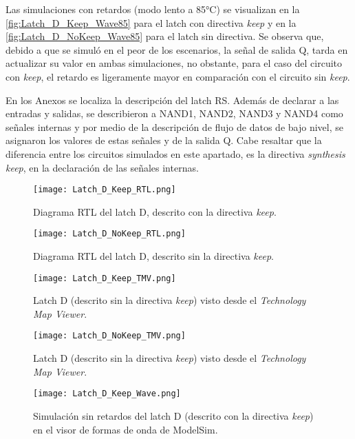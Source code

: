 Las simulaciones con retardos (modo lento a 85°C) se visualizan en la \autoref{fig:Latch_D_Keep_Wave85} para el latch con directiva \textit{keep} y en la \autoref{fig:Latch_D_NoKeep_Wave85} para el latch sin directiva. Se observa que, debido a que se simuló en el peor de los escenarios, la señal de salida Q, tarda en actualizar su valor en ambas simulaciones, no obstante, para el caso del circuito con \textit{keep}, el retardo es ligeramente mayor en comparación con el circuito sin \textit{keep}.

En los Anexos se localiza la descripción del latch RS. Además de declarar a las entradas y salidas, se describieron a NAND1, NAND2, NAND3 y NAND4 como señales internas y por medio de la descripción de flujo de datos de bajo nivel, se asignaron los valores de estas señales y de la salida Q. Cabe resaltar que la diferencia entre los circuitos simulados en este apartado, es la directiva \textit{synthesis keep}, en la declaración de las señales internas.

\begin{figure}[ht]
	\centering
	\texttt{[image: Latch\_D\_Keep\_RTL.png]}
	\caption{Diagrama RTL del latch D, descrito con la directiva \textit{keep}. \label{fig:Latch_D_Keep_RTL}}
\end{figure}

\begin{figure}[ht]
	\centering
	\texttt{[image: Latch\_D\_NoKeep\_RTL.png]}
	\caption{Diagrama RTL del latch D, descrito sin la directiva \textit{keep}. \label{fig:Latch_D_NoKeep_RTL}}
\end{figure}

\begin{figure}[ht]
	\centering
	\texttt{[image: Latch\_D\_Keep\_TMV.png]}
	\caption{Latch D (descrito sin la directiva \textit{keep}) visto desde el \textit{Technology Map Viewer}. \label{fig:Latch_D_Keep_TMV}}
\end{figure}

\begin{figure}[ht]
	\centering
	\texttt{[image: Latch\_D\_NoKeep\_TMV.png]}
	\caption{Latch D (descrito sin la directiva \textit{keep}) visto desde el \textit{Technology Map Viewer}. \label{fig:Latch_D_NoKeep_TMV}}
\end{figure}

\begin{figure}[ht]
	\centering
	\texttt{[image: Latch\_D\_Keep\_Wave.png]}
	\caption{Simulación sin retardos del latch D (descrito con la directiva \textit{keep}) en el visor de formas de onda de ModelSim. \label{fig:Latch_D_Keep_Wave}}
\end{figure}

